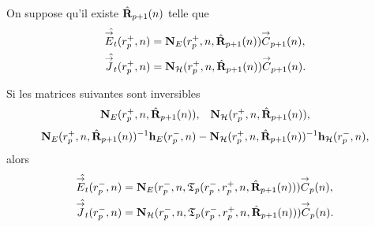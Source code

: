     \begin{prop}%
      \label{prop:sphere:transfert:reflexion}
      On suppose qu'il existe \(\hat{\mathbf{R}}_{p+1}(n)\) telle que 
      \begin{align*}
        \hat{{\overset{\rightarrow}{E}}_t}(r_{p}^+,n) &= \mathbf{N}_{E}(r_p^+,n,\hat{\mathbf{R}}_{p+1}(n)){\overset{\rightarrow}{C}}_{p+1}(n),
        \\
        \hat{{\overset{\rightarrow}{J}}_t}(r_{p}^+,n) &= \mathbf{N}_{\mathcal{H}}(r_p^+,n,\hat{\mathbf{R}}_{p+1}(n)){\overset{\rightarrow}{C}}_{p+1}(n).
      \end{align*}

      Si les matrices suivantes sont inversibles
      \begin{align*}
        \mathbf{N}_{E}(r_p^+,n,\hat{\mathbf{R}}_{p+1}(n)), && \mathbf{N}_{\mathcal{H}}(r_p^+,n,\hat{\mathbf{R}}_{p+1}(n)),
      \end{align*}
      \begin{align*}
        \mathbf{N}_{E}(r_p^+,n,\hat{\mathbf{R}}_{p+1}(n))^{-1}\mathbf{h}_{E}(r_p^-,n) - \mathbf{N}_{\mathcal{H}}(r_p^+,n,\hat{\mathbf{R}}_{p+1}(n))^{-1}\mathbf{h}_{\mathcal{H}}(r_p^-,n),
      \end{align*}
      alors
      \begin{align*}
        \hat{{\overset{\rightarrow}{E}}_t}(r_{p}^-,n) &= \mathbf{N}_{E}(r_p^-,n,\mathfrak{T}_p(r_p^-,r_p^+,n,\hat{\mathbf{R}}_{p+1}(n))){\overset{\rightarrow}{C}}_{p}(n),
        \\
        \hat{{\overset{\rightarrow}{J}}_t}(r_{p}^-,n) &= \mathbf{N}_{\mathcal{H}}(r_p^-,n,\mathfrak{T}_p(r_p^-,r_p^+,n,\hat{\mathbf{R}}_{p+1}(n))){\overset{\rightarrow}{C}}_{p}(n).
      \end{align*}
    \end{prop}

